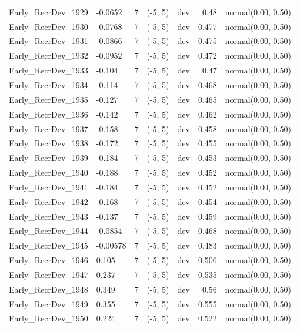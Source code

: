 \documentclass[
]{scrartcl}
\begin{document}
\begin{landscape}
\begin{longtable}{llrllrl}
Early\_RecrDev\_1929 & -0.0652 & 7 & (-5, 5) & dev & 0.48 & normal(0.00, 0.50) \\ 
Early\_RecrDev\_1930 & -0.0768 & 7 & (-5, 5) & dev & 0.477 & normal(0.00, 0.50) \\ 
Early\_RecrDev\_1931 & -0.0866 & 7 & (-5, 5) & dev & 0.475 & normal(0.00, 0.50) \\ 
Early\_RecrDev\_1932 & -0.0952 & 7 & (-5, 5) & dev & 0.472 & normal(0.00, 0.50) \\ 
Early\_RecrDev\_1933 & -0.104 & 7 & (-5, 5) & dev & 0.47 & normal(0.00, 0.50) \\ 
Early\_RecrDev\_1934 & -0.114 & 7 & (-5, 5) & dev & 0.468 & normal(0.00, 0.50) \\ 
Early\_RecrDev\_1935 & -0.127 & 7 & (-5, 5) & dev & 0.465 & normal(0.00, 0.50) \\ 
Early\_RecrDev\_1936 & -0.142 & 7 & (-5, 5) & dev & 0.462 & normal(0.00, 0.50) \\ 
Early\_RecrDev\_1937 & -0.158 & 7 & (-5, 5) & dev & 0.458 & normal(0.00, 0.50) \\ 
Early\_RecrDev\_1938 & -0.172 & 7 & (-5, 5) & dev & 0.455 & normal(0.00, 0.50) \\ 
Early\_RecrDev\_1939 & -0.184 & 7 & (-5, 5) & dev & 0.453 & normal(0.00, 0.50) \\ 
Early\_RecrDev\_1940 & -0.188 & 7 & (-5, 5) & dev & 0.452 & normal(0.00, 0.50) \\ 
Early\_RecrDev\_1941 & -0.184 & 7 & (-5, 5) & dev & 0.452 & normal(0.00, 0.50) \\ 
Early\_RecrDev\_1942 & -0.168 & 7 & (-5, 5) & dev & 0.454 & normal(0.00, 0.50) \\ 
Early\_RecrDev\_1943 & -0.137 & 7 & (-5, 5) & dev & 0.459 & normal(0.00, 0.50) \\ 
Early\_RecrDev\_1944 & -0.0854 & 7 & (-5, 5) & dev & 0.468 & normal(0.00, 0.50) \\ 
Early\_RecrDev\_1945 & -0.00578 & 7 & (-5, 5) & dev & 0.483 & normal(0.00, 0.50) \\ 
Early\_RecrDev\_1946 & 0.105 & 7 & (-5, 5) & dev & 0.506 & normal(0.00, 0.50) \\ 
Early\_RecrDev\_1947 & 0.237 & 7 & (-5, 5) & dev & 0.535 & normal(0.00, 0.50) \\ 
Early\_RecrDev\_1948 & 0.349 & 7 & (-5, 5) & dev & 0.56 & normal(0.00, 0.50) \\ 
Early\_RecrDev\_1949 & 0.355 & 7 & (-5, 5) & dev & 0.555 & normal(0.00, 0.50) \\ 
Early\_RecrDev\_1950 & 0.224 & 7 & (-5, 5) & dev & 0.522 & normal(0.00, 0.50) \\ 

\end{longtable}
\end{landscape}
\end{document}
